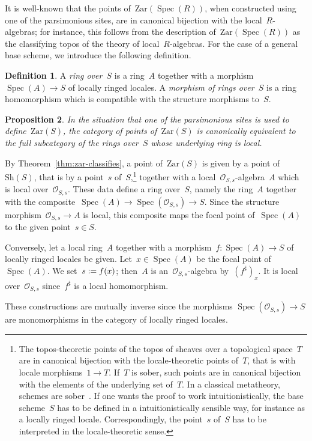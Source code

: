 \documentclass[10pt,reqno,a4paper]{amsbook}
\makeatletter
\theoremstyle{definition}
\newtheorem{defn}{Definition}[section]
\theoremstyle{plain}
\newtheorem{prop}[defn]{Proposition}
\theoremstyle{remark}
\renewcommand{\O}{\mathcal{O}}
\newcommand{\Sh}{\mathrm{Sh}}
\newcommand{\Zar}{\mathrm{Zar}}
\DeclareMathOperator{\Spec}{Spec}
\newcommand{\?}{\,{:}\,}
\renewcommand{\_}{\mathpunct{.}\,}
\newcommand{\stacksproject}[1]{\cite[{\href{http://stacks.math.columbia.edu/tag/#1}{Tag~#1}}]{stacks-project}}
\newcommand{\defeq}{\vcentcolon=}
\renewenvironment{proof}[1][\proofname]{\par
  \pushQED{\qed}%
  \normalfont \topsep6\p@\@plus6\p@\relax
  \trivlist
  \item[\hskip\labelsep
        \itshape
    #1\@addpunct{.}]\ignorespaces
}{%
  \popQED\endtrivlist\@endpefalse
}
\makeatother
\begin{document}
It is well-known that the points of~$\Zar(\Spec(R))$, when constructed using
one of the parsimonious sites, are in canonical bijection with the
local~$R$-algebras; for instance, this follows from the description
of~$\Zar(\Spec(R))$ as the classifying topos of the theory of
local~$R$-algebras. For the case of a general base scheme, we introduce the
following definition.

\begin{defn}\label{defn:ring-over-s}A \emph{ring over~$S$} is a ring~$A$ together with a
morphism~$\Spec(A) \to S$ of locally ringed locales. A \emph{morphism of rings
over~$S$} is a ring homomorphism which is compatible with the structure
morphisms to~$S$.\end{defn}

\begin{prop}\label{prop:points-of-big-zariski}
In the situation that one of the parsimonious sites is used to
define~$\Zar(S)$, the category of points of~$\Zar(S)$ is canonically equivalent
to the full subcategory of the rings over~$S$ whose underlying ring is
local.\end{prop}

\begin{proof}By Theorem~\ref{thm:zar-classifies}, a point of~$\Zar(S)$ is given
by a point of~$\Sh(S)$, that is by a point~$s$ of~$S$,\footnote{The
topos-theoretic points of the topos of sheaves over a topological space~$T$ are
in canonical bijection with the locale-theoretic points of~$T$, that is with
locale morphisms~$1 \to T$. If~$T$ is sober, such points are in canonical
bijection with the elements of the underlying set of~$T$. In a classical
metatheory, schemes are sober~\stacksproject{01IS}. If one wants the proof to
work intuitionistically, the base scheme~$S$ has to be defined in a
intuitionistically sensible way, for instance as a locally ringed locale.
Correspondingly, the point~$s$ of~$S$ has to be interpreted in the
locale-theoretic sense.} together with a local~$\O_{S,s}$-algebra~$A$ which is
local over~$\O_{S,s}$. These data define a ring over~$S$, namely the ring~$A$
together with the composite~$\Spec(A) \to \Spec(\O_{S,s}) \to S$.
Since the structure morphism~$\O_{S,s} \to A$ is local, this composite maps the
focal point of~$\Spec(A)$ to the given point~$s \in S$.

Conversely, let a local ring~$A$ together with a morphism~$f : \Spec(A) \to S$ of
locally ringed locales be given. Let~$x \in \Spec(A)$ be the focal point
of~$\Spec(A)$. We set~$s \defeq f(x)$; then~$A$ is an~$\O_{S,s}$-algebra
by~$(f^\sharp)_x$. It is local over~$\O_{S,s}$ since~$f^\sharp$ is a local
homomorphism.

These constructions are mutually inverse since the morphisms $\Spec(\O_{S,s})
\to S$ are monomorphisms in the category of locally ringed locales.
\end{proof}
\end{document}
